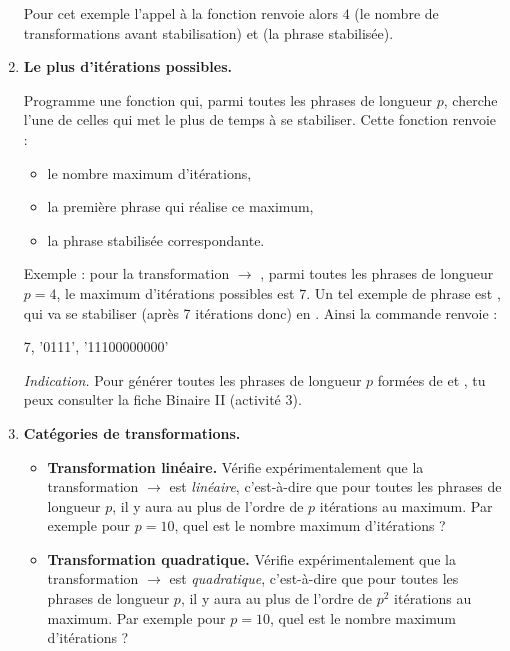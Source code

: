 \documentclass[11pt,class=report,crop=false]{standalone}
\begin{document}
\begin{activite}
\begin{enumerate}
\medskip

Pour cet exemple l'appel à la fonction  renvoie alors $4$ (le nombre de transformations avant stabilisation) et  (la phrase stabilisée).

	\item \textbf{Le plus d'itérations possibles.}
	
	Programme une fonction  
qui, parmi toutes les phrases de longueur $p$, cherche l'une de celles qui met le plus de temps à se stabiliser. Cette fonction renvoie :
\begin{itemize}
  \item le nombre maximum d'itérations,
  \item la première phrase qui réalise ce maximum,
  \item la phrase stabilisée correspondante.
\end{itemize}

Exemple : pour la transformation \rzero\run{} $\rightarrow$ \run\rzero\rzero, parmi toutes les phrases de longueur $p=4$, le maximum d'itérations possibles est $7$. Un tel exemple de phrase est \rzero\run\run\run, qui va se stabiliser (après 7 itérations donc) en \run\run\run\rzero\rzero\rzero\rzero\rzero\rzero\rzero\rzero.
Ainsi la commande  renvoie : 

\centerline{7, '0111', '11100000000'}


  \emph{Indication.} Pour générer toutes les phrases de longueur $p$ formées de \rzero{} et \run{}, tu peux consulter la fiche \og{}Binaire II\fg{} (activité 3).

	\item \textbf{Catégories de transformations.}
	
	\begin{itemize} 
	\item \textbf{Transformation linéaire.}
	Vérifie expérimentalement que la transformation \rzero\rzero\run\run{} $\rightarrow$ \run\run\rzero{} est \emph{linéaire}, c'est-à-dire que pour toutes les phrases de longueur $p$, il y aura au plus de l'ordre de $p$ itérations au maximum. Par exemple pour $p=10$, quel est le nombre maximum d'itérations  ?
	
	\item \textbf{Transformation quadratique.}
	Vérifie expérimentalement que la transformation \rzero\run{} $\rightarrow$ \run\rzero{} est \emph{quadratique}, c'est-à-dire que pour toutes les phrases de longueur $p$, il y aura au plus de l'ordre de $p^2$ itérations au maximum. Par exemple pour $p=10$, quel est le nombre maximum d'itérations  ?
	

\end{itemize}
\end{enumerate}
\end{activite}
\end{document}
